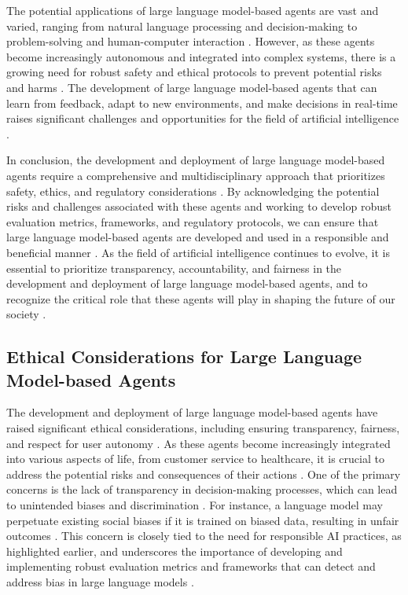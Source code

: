 \documentclass[11pt,a4paper]{article}
\begin{document}
The potential applications of large language model-based agents are vast and varied, ranging from natural language processing and decision-making to problem-solving and human-computer interaction \cite{arxiv:2309.02427}. However, as these agents become increasingly autonomous and integrated into complex systems, there is a growing need for robust safety and ethical protocols to prevent potential risks and harms \cite{doi:10.1038/s41746-024-01083-y}. The development of large language model-based agents that can learn from feedback, adapt to new environments, and make decisions in real-time raises significant challenges and opportunities for the field of artificial intelligence \cite{arxiv:2402.01680}. 

In conclusion, the development and deployment of large language model-based agents require a comprehensive and multidisciplinary approach that prioritizes safety, ethics, and regulatory considerations \cite{doi:10.1109/mnet.2024.3435752}. By acknowledging the potential risks and challenges associated with these agents and working to develop robust evaluation metrics, frameworks, and regulatory protocols, we can ensure that large language model-based agents are developed and used in a responsible and beneficial manner \cite{arxiv:2405.03207}. As the field of artificial intelligence continues to evolve, it is essential to prioritize transparency, accountability, and fairness in the development and deployment of large language model-based agents, and to recognize the critical role that these agents will play in shaping the future of our society \cite{doi:10.54254/2755-2721/35/20230399}.


\subsection{Ethical Considerations for Large Language Model-based Agents}


The development and deployment of large language model-based agents have raised significant ethical considerations, including ensuring transparency, fairness, and respect for user autonomy \cite{arxiv:2309.14365}. As these agents become increasingly integrated into various aspects of life, from customer service to healthcare, it is crucial to address the potential risks and consequences of their actions \cite{arxiv:2402.06196}. One of the primary concerns is the lack of transparency in decision-making processes, which can lead to unintended biases and discrimination \cite{doi:10.1007/s10849-023-09409-x}. For instance, a language model may perpetuate existing social biases if it is trained on biased data, resulting in unfair outcomes \cite{arxiv:2311.07621}. This concern is closely tied to the need for responsible AI practices, as highlighted earlier, and underscores the importance of developing and implementing robust evaluation metrics and frameworks that can detect and address bias in large language models \cite{doi:10.1145/3641289}.
\end{document}
